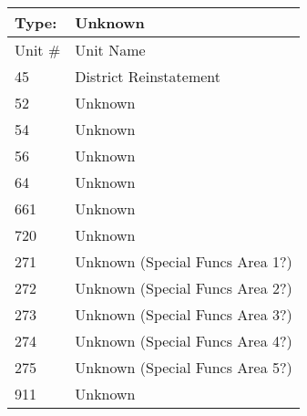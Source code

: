 \begin{table}
\tiny
\centering
\caption{}\label{tab:unk}
\begin{tabular}{|ll|}
\hline
Type: &	\textbf{Unknown} \\
\hline
Unit \# &	Unit Name \\
\hline
45  & District Reinstatement \\
52  & Unknown\\
54  & Unknown\\
56  & Unknown\\
64  & Unknown\\
661 & Unknown\\
720 & Unknown\\
271 & Unknown (Special Funcs Area 1?)\\
272 & Unknown (Special Funcs Area 2?)\\
273 & Unknown (Special Funcs Area 3?)\\
274 & Unknown (Special Funcs Area 4?)\\
275 & Unknown (Special Funcs Area 5?)\\
911 & Unknown \\
\hline
\end{tabular}
\end{table}


